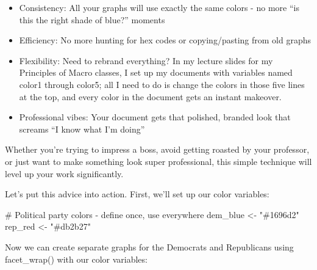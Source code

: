 \documentclass[
  letterpaper,
]{book}
\newenvironment{Shaded}{\begin{snugshade}}{\end{snugshade}}
\newcommand{\CommentTok}[1]{\textcolor[rgb]{0.37,0.37,0.37}{#1}}
\newcommand{\NormalTok}[1]{\textcolor[rgb]{0.00,0.23,0.31}{#1}}
\newcommand{\OtherTok}[1]{\textcolor[rgb]{0.00,0.23,0.31}{#1}}
\newcommand{\StringTok}[1]{\textcolor[rgb]{0.13,0.47,0.30}{#1}}
\providecommand{\tightlist}{%
  \setlength{\itemsep}{0pt}\setlength{\parskip}{0pt}}\usepackage{longtable,booktabs,array}
\begin{document}
\begin{tcolorbox}
\begin{itemize}
\tightlist
\item
  Consistency: All your graphs will use exactly the same colors - no
  more ``is this the right shade of blue?'' moments
\item
  Efficiency: No more hunting for hex codes or copying/pasting from old
  graphs
\item
  Flexibility: Need to rebrand everything? In my lecture slides for my
  Principles of Macro classes, I set up my documents with variables
  named color1 through color5; all I need to do is change the colors in
  those five lines at the top, and every color in the document gets an
  instant makeover.
\item
  Professional vibes: Your document gets that polished, branded look
  that screams ``I know what I'm doing''
\end{itemize}

Whether you're trying to impress a boss, avoid getting roasted by your
professor, or just want to make something look super professional, this
simple technique will level up your work significantly.

\end{tcolorbox}

Let's put this advice into action. First, we'll set up our color
variables:

\begin{Shaded}
\begin{Highlighting}[]
\CommentTok{\# Political party colors {-} define once, use everywhere}
\NormalTok{dem\_blue }\OtherTok{\textless{}{-}} \StringTok{"\#1696d2"}
\NormalTok{rep\_red }\OtherTok{\textless{}{-}} \StringTok{"\#db2b27"}
\end{Highlighting}
\end{Shaded}

Now we can create separate graphs for the Democrats and Republicans
using facet\_wrap() with our color variables:
\end{document}
